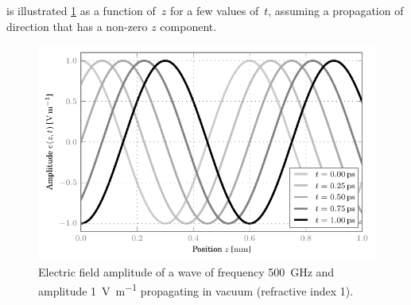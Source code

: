  is illustrated \cref{fig:plane_wave_propagation} as a function of~$z$ for a few values of~$t$, assuming a propagation of direction that has a non-zero $z$ component.

\begin{figure}[hbtp]
    \centering
    \includegraphics{plane_wave_propagation}
    \caption{Electric field amplitude of a wave of frequency \SI{500}{\giga\hertz} and amplitude \SI{1}{\volt\per\meter} propagating in vacuum (refractive index 1).}
    \label{fig:plane_wave_propagation}
\end{figure}


